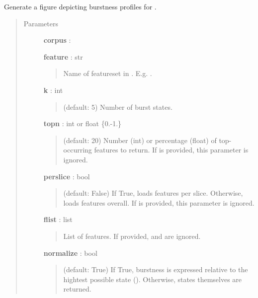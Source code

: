 \documentclass[letterpaper,10pt,english]{sphinxmanual}
\begin{document}
\begin{fulllineitems}
\label{tethne.analyze.corpus:tethne.analyze.corpus.plot_burstness}
Generate a figure depicting burstness profiles for .
\begin{quote}\begin{description}
\item[{Parameters}] \leavevmode
\textbf{corpus} : {\hyperref[tethne.classes.corpus:tethne.classes.corpus.Corpus]{}}

\textbf{feature} : str
\begin{quote}

Name of featureset in . E.g. .
\end{quote}

\textbf{k} : int
\begin{quote}

(default: 5) Number of burst states.
\end{quote}

\textbf{topn} : int or float \{0.-1.\}
\begin{quote}

(default: 20) Number (int) or percentage (float) of top-occurring 
features to return. If  is provided, this parameter is ignored.
\end{quote}

\textbf{perslice} : bool
\begin{quote}

(default: False) If True, loads  features per slice. Otherwise,
loads  features overall. If  is provided, this
parameter is ignored.
\end{quote}

\textbf{flist} : list
\begin{quote}

List of features. If provided,  and  are ignored.
\end{quote}

\textbf{normalize} : bool
\begin{quote}

(default: True) If True, burstness is expressed relative to the hightest
possible state (). Otherwise, states themselves are returned.
\end{quote}


\end{description}
\end{quote}
\end{fulllineitems}
\end{document}
